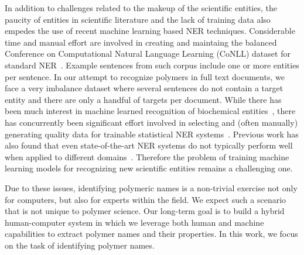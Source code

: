 In addition to challenges related to the makeup of the scientific entities, the paucity of entities in scientific literature and the lack of training data also empedes the use of recent machine learning based NER techniques.
Considerable time and manual effort are involved in creating and maintaing the balanced
Conference on Computational Natural Language Learning (CoNLL) dataset for standard NER~\cite{tjong2003introduction}.
Example sentences from such corpus include one or more entities per sentence. 
In our attempt to recognize polymers in full text documents, we face a very imbalance dataset where several sentences do not contain a target entity and there are only a handful of targets per document.
While there has been much interest in machine learned recognition of biochemical entities~\cite{jessop2011oscar4,rocktaschel2012chemspot,leaman2015tmchem,swain2016chemdataextractor}, there has concurrently been significant effort involved in selecting and (often manually) generating quality data for
trainable statistical NER systems~\cite{krallinger2015chemdner}. 
Previous work has also found that even state-of-the-art NER systems do
not typically perform well when applied to different domains~\cite{krallinger2013overview}. 
Therefore the problem of training machine learning models for recognizing new scientific entities remains a challenging one.

Due to these issues, identifying polymeric names is a non-trivial exercise not only for computers, but also for experts within the field. 
We expect such a scenario that is not unique to polymer science.
Our long-term goal is to build a hybrid human-computer system in which we leverage both 
human and machine capabilities to extract polymer names and their properties. 
In this work, we focus on the task of identifying polymer names.
